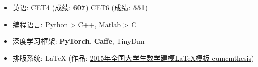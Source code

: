 \documentclass[paper=a4,fontsize=11pt]{temp} %
\begin{document}
\noindent
\begin{itemize}
\item 英语: CET4 (成绩: \textbf{607}) \hspace*{3cm} CET6 (成绩: \textbf{551})
\item 编程语言: Python > C++, Matlab > C
\item 深度学习框架: \textbf{PyTorch}, \textbf{Caffe}, TinyDnn
\item 排版系统: LaTeX (作品:\color{LinkColor}
\href{http://www.latexstudio.net/archives/4200}{2015年全国大学生数学建模LaTeX模板 cumcmthesis})
\end{itemize}


%
%
%
%
%
%
%
%
%
%
\end{document}

